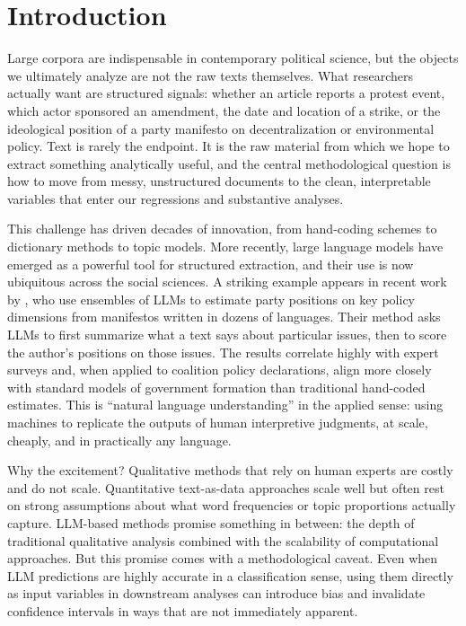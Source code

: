 \section{Introduction}\label{sec:introduction}

Large corpora are indispensable in contemporary political science, but the objects we ultimately analyze are not the raw texts themselves. What researchers actually want are structured signals: whether an article reports a protest event, which actor sponsored an amendment, the date and location of a strike, or the ideological position of a party manifesto on decentralization or environmental policy. Text is rarely the endpoint. It is the raw material from which we hope to extract something analytically useful, and the central methodological question is how to move from messy, unstructured documents to the clean, interpretable variables that enter our regressions and substantive analyses.

This challenge has driven decades of innovation, from hand-coding schemes to dictionary methods to topic models. More recently, large language models have emerged as a powerful tool for structured extraction, and their use is now ubiquitous across the social sciences. A striking example appears in recent work by \citet{BenoitEtAl2025}, who use ensembles of LLMs to estimate party positions on key policy dimensions from manifestos written in dozens of languages. Their method asks LLMs to first summarize what a text says about particular issues, then to score the author's positions on those issues. The results correlate highly with expert surveys and, when applied to coalition policy declarations, align more closely with standard models of government formation than traditional hand-coded estimates. This is ``natural language understanding'' in the applied sense: using machines to replicate the outputs of human interpretive judgments, at scale, cheaply, and in practically any language.

Why the excitement? Qualitative methods that rely on human experts are costly and do not scale. Quantitative text-as-data approaches scale well but often rest on strong assumptions about what word frequencies or topic proportions actually capture. LLM-based methods promise something in between: the depth of traditional qualitative analysis combined with the scalability of computational approaches. But this promise comes with a methodological caveat. Even when LLM predictions are highly accurate in a classification sense, using them directly as input variables in downstream analyses can introduce bias and invalidate confidence intervals in ways that are not immediately apparent.

